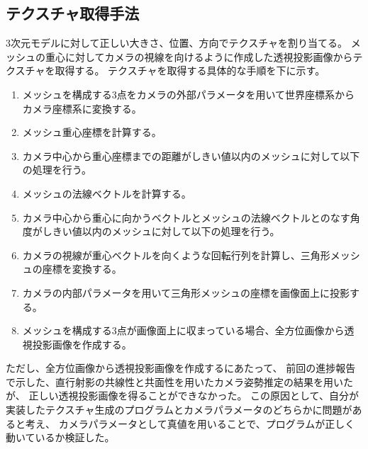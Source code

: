 \documentclass[]{jarticle}          %
\begin{document}
\subsection{テクスチャ取得手法}
3次元モデルに対して正しい大きさ、位置、方向でテクスチャを割り当てる。
メッシュの重心に対してカメラの視線を向けるように作成した透視投影画像からテクスチャを取得する。
テクスチャを取得する具体的な手順を下に示す\cite{bib_1}。
\begin{enumerate}
  \item メッシュを構成する3点をカメラの外部パラメータを用いて世界座標系からカメラ座標系に変換する。
  \item メッシュ重心座標を計算する。
  \item カメラ中心から重心座標までの距離がしきい値以内のメッシュに対して以下の処理を行う。
  \item メッシュの法線ベクトルを計算する。
  \item カメラ中心から重心に向かうベクトルとメッシュの法線ベクトルとのなす角度がしきい値以内のメッシュに対して以下の処理を行う。
  \item カメラの視線が重心ベクトルを向くような回転行列を計算し、三角形メッシュの座標を変換する。
  \item カメラの内部パラメータを用いて三角形メッシュの座標を画像面上に投影する。
  \item メッシュを構成する3点が画像面上に収まっている場合、全方位画像から透視投影画像を作成する。
\end{enumerate}

ただし、全方位画像から透視投影画像を作成するにあたって、
前回の進捗報告で示した、直行射影の共線性と共面性を用いたカメラ姿勢推定の結果を用いたが、
正しい透視投影画像を得ることができなかった。
この原因として、自分が実装したテクスチャ生成のプログラムとカメラパラメータのどちらかに問題があると考え、
カメラパラメータとして真値を用いることで、プログラムが正しく動いているか検証した。
\end{document}
